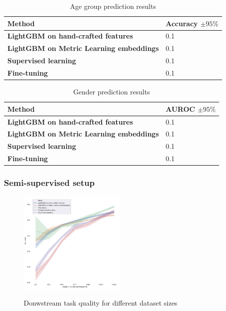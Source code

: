 \documentclass[sigconf]{acmart}
\begin{document}
\begin{table}[ht]
\caption{Age group prediction results}
\begin{tabular}{ | m{18em} |  m{6em} | }
\hline
\textbf{Method} & \textbf{Accuracy $\pm 95\%$} \\
\hline
\textbf{LightGBM on hand-crafted features} & 0.1 \\
\textbf{LightGBM on Metric Learning embeddings} & 0.1 \\
\textbf{Supervised learning} & 0.1  \\
\textbf{Fine-tuning} & 0.1  \\
\hline
\end{tabular}
\label{tab-age-pred}
\end{table}

\begin{table}[ht]
\caption{Gender prediction results}
\begin{tabular}{ | m{18em} |  m{6em} | }
\hline
\textbf{Method} & \textbf{AUROC $\pm 95\%$} \\
\hline
\textbf{LightGBM on hand-crafted features} & 0.1 \\
\textbf{LightGBM on Metric Learning embeddings} & 0.1 \\
\textbf{Supervised learning} & 0.1  \\
\textbf{Fine-tuning} & 0.1  \\
\hline
\end{tabular}
\label{tab-sex-pred}
\end{table}

\subsubsection{Semi-supervised setup} \label{sec-semi}

\begin{figure}[ht]
  \caption{Donwstream task quality for different dataset sizes}
  \includegraphics[width=0.46\textwidth]{figures/semi_supervised_setup.png}
  \label{fig-semi}
\end{figure}
\end{document}
